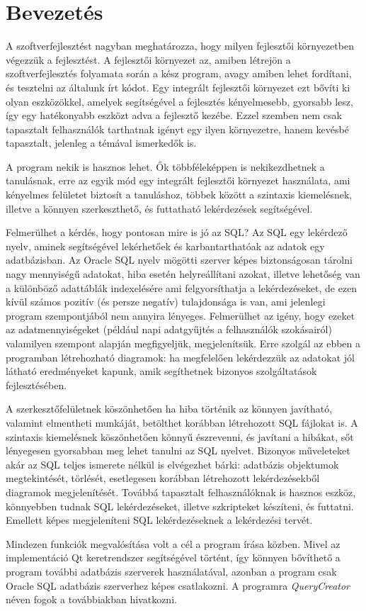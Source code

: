 \chapter{Bevezetés}

A szoftverfejlesztést nagyban meghatározza, hogy milyen fejlesztői környezetben végezzük a fejlesztést. A fejlesztői
környezet az, amiben létrejön a szoftverfejlesztés folyamata során a kész program, avagy amiben
lehet fordítani, és tesztelni az általunk írt kódot. Egy integrált fejlesztői környezet ezt bővíti
ki olyan eszközökkel, amelyek segítségével a fejlesztés kényelmesebb, gyorsabb lesz, így egy
hatékonyabb eszközt adva a fejlesztő kezébe. Ezzel szemben nem csak tapasztalt felhasználók tarthatnak igényt
egy ilyen környezetre, hanem kevésbé tapasztalt, jelenleg a témával ismerkedők is.

A program nekik is hasznos lehet. 
Ők többféleképpen is nekikezdhetnek a tanulásnak, erre az
egyik mód egy integrált fejlesztői környezet használata, ami kényelmes
felületet biztosít a tanuláshoz, többek között a szintaxis kiemelésnek,
illetve a könnyen szerkeszthető, és futtatható lekérdezések segítségével.

Felmerülhet a kérdés, hogy pontosan mire is jó az SQL? Az SQL egy lekérdező nyelv, aminek segítségével lekérhetőek és karbantarthatóak az adatok egy adatbázisban.
Az Oracle SQL nyelv mögötti szerver képes biztonságosan tárolni nagy
mennyiségű adatokat, hiba esetén helyreállítani azokat, illetve lehetőség van a különböző adattáblák indexelésére
ami felgyorsíthatja a lekérdezéseket, de ezen kívül számos pozitív (és persze negatív) tulajdonsága is van,
ami jelenlegi program szempontjából nem annyira lényeges. Felmerülhet az igény, hogy ezeket az adatmennyiségeket
(például napi adatgyűjtés a felhasználók szokásairól) valamilyen szempont alapján megfigyeljük, megjelenítsük.
Erre szolgál az ebben a programban létrehozható diagramok: ha megfelelően lekérdezzük az adatokat jól látható
eredményeket kapunk, amik segíthetnek bizonyos szolgáltatások fejlesztésében.

A szerkesztőfelületnek köszönhetően ha hiba történik az könnyen
javítható, valamint elmentheti munkáját, betölthet korábban létrehozott
SQL fájlokat is. A szintaxis kiemelésnek köszönhetően könnyű észrevenni,
és javítani a hibákat, sőt lényegesen gyorsabban meg lehet tanulni az SQL
nyelvet. Bizonyos műveleteket akár az SQL teljes ismerete nélkül is elvégezhet bárki:
adatbázis objektumok megtekintését, törlését, esetlegesen korábban létrehozott lekérdezésekből
diagramok megjelenítését.
Továbbá tapasztalt felhasználóknak is hasznos eszköz, könnyebben tudnak SQL
lekérdezéseket, illetve szkripteket készíteni, és futtatni. Emellett képes megjeleníteni
SQL lekérdezéseknek a lekérdezési tervét.

Mindezen funkciók megvalósítása volt a cél a program írása közben. Mivel az
implementáció Qt keretrendszer segítségével történt, így könnyen bővíthető a program további adatbázis szerverek
használatával, azonban a program csak Oracle SQL adatbázis szerverhez képes csatlakozni.
A programra \textit{QueryCreator} néven fogok a továbbiakban hivatkozni.